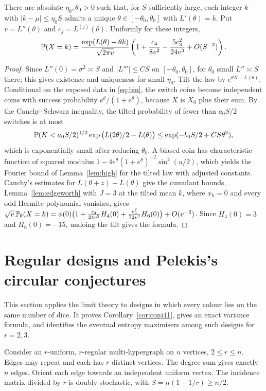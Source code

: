\documentclass[11pt,a4paper]{article}
\theoremstyle{definition}\newtheorem{remark}[theorem]{Remark}\newtheorem{conjecture}{Conjecture}
\begin{document}
\begin{proposition}\label{prop:saddle}
There are absolute $\eta_0,\theta_0>0$ such that, for $S$ sufficiently large, each integer $k$ with $|k-\mu|\le\eta_0 S$ admits a unique $\theta\in[-\theta_0,\theta_0]$ with $L'(\theta)=k$. Put $v=L''(\theta)$ and $c_j=L^{(j)}(\theta)$. Uniformly for these integers,
\[
 \mathbb P(X=k)=\frac{\exp(L(\theta)-\theta k)}{\sqrt{2\pi v}}
 \left(1+\frac{c_4}{8v^2}-\frac{5c_3^2}{24v^3}+O(S^{-2})\right).
\]
\end{proposition}
\begin{proof}
Since $L''(0)=\sigma^2\asymp S$ and $|L'''|\le CS$ on $[-\theta_0,\theta_0]$, for $\theta_0$ small $L''\asymp S$ there; this gives existence and uniqueness for small $\eta_0$. Tilt the law by $e^{\theta X-L(\theta)}$. Conditional on the exposed data in \eqref{eq:bin}, the switch coins become independent coins with success probability $e^\theta/(1+e^\theta)$, because $X$ is $X_0$ plus their sum. By the Cauchy--Schwarz inequality, the tilted probability of fewer than $a_0S/2$ switches is at most
\[
 \mathbb P(K<a_0S/2)^{1/2}\exp\big(L(2\theta)/2-L(\theta)\big)\le \exp(-b_0 S/2+CS\theta^2),
\]
which is exponentially small after reducing $\theta_0$. A biased coin has characteristic function of squared modulus $1-4e^\theta(1+e^\theta)^{-2}\sin^2(u/2)$, which yields the Fourier bound of Lemma~\ref{lem:high} for the tilted law with adjusted constants. Cauchy's estimates for $L(\theta+z)-L(\theta)$ give the cumulant bounds. Lemma~\ref{lem:edgeworth} with $J=3$ at the tilted mean $k$, where $x_k=0$ and every odd Hermite polynomial vanishes, gives $\sqrt{v}\,\mathbb P_\theta(X=k)=\phi(0)\big(1+\frac{c_4}{24v^2}H_4(0)+\frac{c_3^2}{72v^3}H_6(0)\big)+O(v^{-2})$. Since $H_4(0)=3$ and $H_6(0)=-15$, undoing the tilt gives the formula.
\end{proof}

\section{Regular designs and Pelekis's circular conjectures}\label{sec:hyper}
This section applies the limit theory to designs in which every colour lies on the same number of dice. It proves Corollary~\ref{cor:conj41}, gives an exact variance formula, and identifies the eventual entropy maximisers among such designs for $r=2,3$.

Consider an $r$-uniform, $r$-regular multi-hypergraph on $n$ vertices, $2\le r\le n$. Edges may repeat and each has $r$ distinct vertices. The degree sum gives exactly $n$ edges. Orient each edge towards an independent uniform vertex. The incidence matrix divided by $r$ is doubly stochastic, with $S=n(1-1/r)\ge n/2$.
\end{document}
